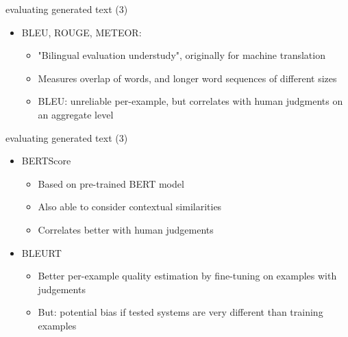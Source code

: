\documentclass[11pt,compress,t,notes=noshow, xcolor=table]{beamer}
\begin{document}

\begin{frame}{evaluating generated text (3)}

\vfill

\begin{itemize}
	\item BLEU, ROUGE, METEOR:
			\begin{itemize}
				\item "Bilingual evaluation understudy", originally for machine translation
				\item Measures overlap of words, and longer word sequences of different sizes
				\item BLEU: unreliable per-example, but correlates with human judgments on an aggregate level 
			\end{itemize}
\end{itemize}

\vfill

\end{frame}


\begin{frame}{evaluating generated text (3)}

\vfill

\begin{itemize}
	\item BERTScore
			\begin{itemize}
				\item Based on pre-trained BERT model
				\item Also able to consider contextual similarities
				\item Correlates better with human judgements
			\end{itemize}
	\item BLEURT
			\begin{itemize}
				\item Better per-example quality estimation by fine-tuning on examples with judgements
				\item But: potential bias if tested systems are very different than training examples
			\end{itemize}
\end{itemize}

\vfill

\end{frame}
\end{document}
